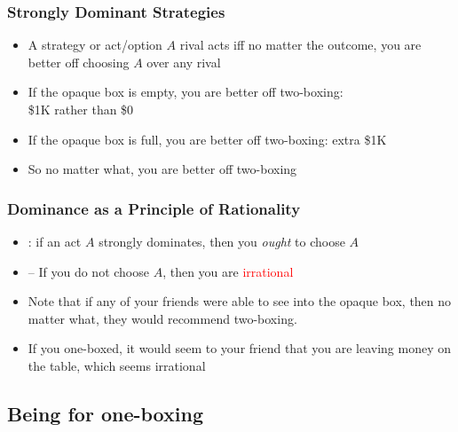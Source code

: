 \begin{frame}
\frametitle{Strongly Dominant Strategies}

\begin{itemize}[<+->]

\item A strategy or act/option $A$  rival acts iff no matter the outcome, you are better off choosing $A$ over any rival 

\item If the opaque box is empty, you are better off two-boxing: \\ \$1K rather than \$0

\item If the opaque box is full, you are better off two-boxing: extra \$1K

\item So no matter what, you are better off two-boxing

\end{itemize}
\end{frame}

\begin{frame}
\frametitle{Dominance as a Principle of Rationality}

\begin{itemize}[<+->]

\item {}: if an act $A$ strongly dominates, then you \textit{ought} to choose $A$

\item[] -- If you do not choose $A$, then you are \textcolor{red}{irrational} 

\item Note that if any of your friends were able to see into the opaque box, then no matter what, they would recommend two-boxing. 

\item If you one-boxed, it would seem to your friend that you are leaving money on the table, which seems irrational

\end{itemize}
\end{frame}

\subsection{Being for one-boxing}

